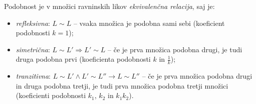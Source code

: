             
            Podobnost je v množici ravninskih likov \textit{ekvivalenčna relacija}, saj je:
                \begin{itemize}
                    \item \textit{refleksivna}: $L\sim L$ -- vsaka množica je podobna sami sebi (koeficient podobnosti $k=1$);
                    \item \textit{simetrična}: $L\sim L' \Rightarrow L'\sim L$ -- če je prva množica podobna drugi, je tudi druga podobna prvi (koeficienta podobnosti $k$ in $\frac{1}{k}$);
                    \item \textit{tranzitivna}: $L\sim L' \land L'\sim L'' \rightarrow L\sim L''$ -- če je prva množica podobna drugi in druga podobna tretji, 
                            je tudi prva množica podobna tretji množici (koeficienti podobnosti $k_1$, $k_2$ in $k_1k_2$).
                \end{itemize}
            

        
~\\~\\~\\

